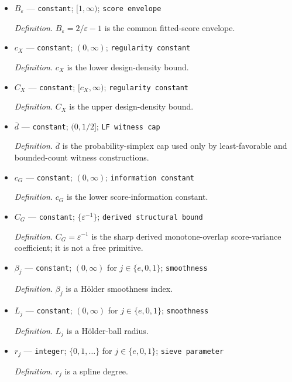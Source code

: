 \documentclass{article}
\begin{document}
\begin{itemize}
  \par\smallskip\noindent\emph{Definition.} \(z_{1-\alpha/2}\) is the \(1-\alpha/2\) standard-normal quantile.
  \item \(B_\varepsilon\) --- \texttt{constant}; \([1,\infty)\); \texttt{score envelope}
  \par\smallskip\noindent\emph{Definition.} \(B_\varepsilon=2/\varepsilon-1\) is the common fitted-score envelope.
  \item \(c_X\) --- \texttt{constant}; \((0,\infty)\); \texttt{regularity constant}
  \par\smallskip\noindent\emph{Definition.} \(c_X\) is the lower design-density bound.
  \item \(C_X\) --- \texttt{constant}; \([c_X,\infty)\); \texttt{regularity constant}
  \par\smallskip\noindent\emph{Definition.} \(C_X\) is the upper design-density bound.
  \item \(\bar d\) --- \texttt{constant}; \((0,1/2]\); \texttt{LF witness cap}
  \par\smallskip\noindent\emph{Definition.} \(\bar d\) is the probability-simplex cap used only by least-favorable and bounded-count witness constructions.
  \item \(c_G\) --- \texttt{constant}; \((0,\infty)\); \texttt{information constant}
  \par\smallskip\noindent\emph{Definition.} \(c_G\) is the lower score-information constant.
  \item \(C_G\) --- \texttt{constant}; \(\{\varepsilon^{-1}\}\); \texttt{derived structural bound}
  \par\smallskip\noindent\emph{Definition.} \(C_G=\varepsilon^{-1}\) is the sharp derived monotone-overlap score-variance coefficient; it is not a free primitive.
  \item \(\beta_j\) --- \texttt{constant}; \((0,\infty)\) for \(j\in\{e,0,1\}\); \texttt{smoothness}
  \par\smallskip\noindent\emph{Definition.} \(\beta_j\) is a Hölder smoothness index.
  \item \(L_j\) --- \texttt{constant}; \((0,\infty)\) for \(j\in\{e,0,1\}\); \texttt{smoothness}
  \par\smallskip\noindent\emph{Definition.} \(L_j\) is a Hölder-ball radius.
  \item \(r_j\) --- \texttt{integer}; \(\{0,1,\ldots\}\) for \(j\in\{e,0,1\}\); \texttt{sieve parameter}
  \par\smallskip\noindent\emph{Definition.} \(r_j\) is a spline degree.

\end{itemize}
\end{document}
